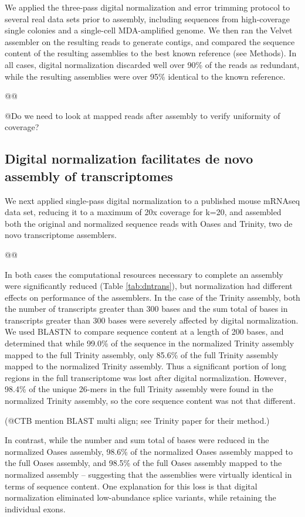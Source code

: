 \documentclass[10pt]{article}
\begin{document}
We applied the three-pass digital normalization and error trimming
protocol to several real data sets prior to assembly, including
sequences from high-coverage single colonies and a single-cell
MDA-amplified genome.  We then ran the Velvet assembler on the
resulting reads to generate contigs, and compared the sequence content
of the resulting assemblies to the best known reference (see Methods).
In all cases, digital normalization discarded well over 90\% of the
reads as redundant, while the resulting assemblies were over 95\%
identical to the known reference.

@@

@Do we need to look at mapped reads after assembly to verify uniformity
of coverage?

\subsection*{Digital normalization facilitates de novo assembly of transcriptomes}

We next applied single-pass digital normalization to a published mouse
mRNAseq data set, reducing it to a maximum of 20x coverage for k=20,
and assembled both the original and normalized sequence reads with
Oases and Trinity, two de novo transcriptome assemblers.

@@

In both cases the computational resources necessary to complete an
assembly were significantly reduced (Table \ref{tab:dntrans}), but
normalization had different effects on performance of the assemblers.
In the case of the Trinity assembly, both the number of transcripts
greater than 300 bases and the sum total of bases in transcripts
greater than 300 bases were severely affected by digital
normalization.  We used BLASTN to compare sequence content at a length
of 200 bases, and determined that while 99.0\% of the sequence in the
normalized Trinity assembly mapped to the full Trinity assembly, only
85.6\% of the full Trinity assembly mapped to the normalized Trinity
assembly.  Thus a significant portion of long regions in the full
transcriptome was lost after digital normalization.  However, 98.4\%
of the unique 26-mers in the full Trinity assembly were found in the
normalized Trinity assembly, so the core sequence content was not that
different.

(@CTB mention BLAST multi align; see Trinity
paper for their method.)

In contrast, while the number and sum total of bases were reduced in
the normalized Oases assembly, 98.6\% of the normalized Oases
assembly mapped to the full Oases assembly, and 98.5\% of the full
Oases assembly mapped to the normalized assembly -- suggesting that
the assemblies were virtually identical in terms of sequence content.
One explanation for this loss is that digital normalization
eliminated low-abundance splice variants, while retaining the
individual exons.
\end{document}
